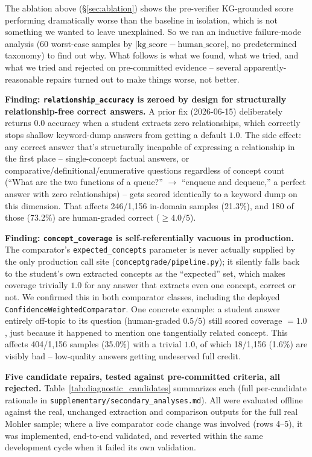 \documentclass[conference]{IEEEtran}
\begin{document}
The ablation above (\S\ref{sec:ablation}) shows the pre-verifier
KG-grounded score performing dramatically worse than the baseline in
isolation, which is not something we wanted to leave unexplained. So
we ran an inductive failure-mode analysis (60 worst-case samples by
$|\text{kg\_score}-\text{human\_score}|$, no predetermined taxonomy)
to find out why. What follows is what we found, what we tried, and
what we tried and rejected on pre-committed evidence -- several
apparently-reasonable repairs turned out to make things worse, not
better.

\textbf{Finding: \texttt{relationship\_accuracy} is zeroed by design
for structurally relationship-free correct answers.} A prior fix
(2026-06-15) deliberately returns $0.0$ accuracy when a student
extracts zero relationships, which correctly stops shallow
keyword-dump answers from getting a default $1.0$. The side effect:
any correct answer that's structurally incapable of expressing a
relationship in the first place -- single-concept factual answers, or
comparative/definitional/enumerative questions regardless of concept
count (``What are the two functions of a queue?'' $\to$ ``enqueue and
dequeue,'' a perfect answer with zero relationships) -- gets scored
identically to a keyword dump on this dimension. That affects
246/1{,}156 in-domain samples (21.3\%), and 180 of those (73.2\%) are
human-graded correct ($\geq 4.0/5$).

\textbf{Finding: \texttt{concept\_coverage} is self-referentially
vacuous in production.} The comparator's \texttt{expected\_concepts}
parameter is never actually supplied by the only production call site
(\texttt{conceptgrade/pipeline.py}); it silently falls back to the
student's own extracted concepts as the ``expected'' set, which makes
coverage trivially $1.0$ for any answer that extracts even one
concept, correct or not. We confirmed this in both comparator
classes, including the deployed \texttt{ConfidenceWeightedComparator}.
One concrete example: a student answer entirely off-topic to its
question (human-graded $0.5/5$) still scored coverage $=1.0$, just
because it happened to mention one tangentially related concept. This
affects 404/1{,}156 samples (35.0\%) with a trivial $1.0$, of which
18/1{,}156 (1.6\%) are visibly bad -- low-quality answers getting
undeserved full credit.

\textbf{Five candidate repairs, tested against pre-committed criteria,
all rejected.} Table~\ref{tab:diagnostic_candidates} summarizes each
(full per-candidate rationale in
\texttt{supplementary/secondary\_analyses.md}). All were evaluated
offline against the real, unchanged extraction and comparison outputs
for the full real Mohler sample; where a live comparator code change
was involved (rows 4--5), it was implemented, end-to-end validated,
and reverted within the same development cycle when it failed its own
validation.
\end{document}
